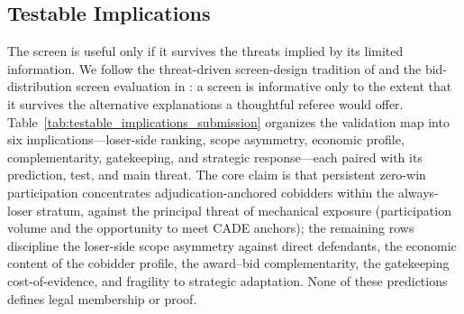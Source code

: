 \subsection{Testable Implications}
\label{sec:testable_implications}

The screen is useful only if it survives the threats implied by
its limited information. We follow the threat-driven screen-design
tradition of \citet{harrington2008detecting} and the
bid-distribution screen evaluation in \citet{imhof2018screening}:
a screen is informative only to the extent that it survives the
alternative explanations a thoughtful referee would offer.
Table~\ref{tab:testable_implications_submission} organizes the
validation map into six implications---loser-side ranking, scope
asymmetry, economic profile, complementarity, gatekeeping, and
strategic response---each paired with its prediction, test, and
main threat. The core claim is that persistent zero-win
participation concentrates adjudication-anchored cobidders within
the always-loser stratum, against the principal threat of
mechanical exposure (participation volume and the opportunity to
meet CADE anchors); the remaining rows discipline the loser-side
scope asymmetry against direct defendants, the economic content of
the cobidder profile, the award--bid complementarity, the
gatekeeping cost-of-evidence, and fragility to strategic
adaptation. None of these predictions defines legal membership or
proof.

